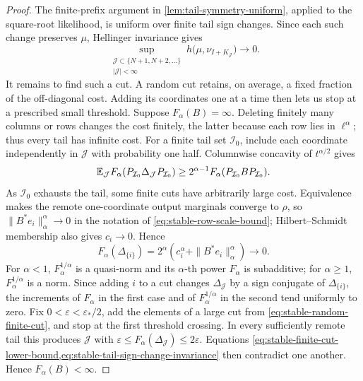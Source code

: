 \begin{proof}
The finite-prefix argument in \cref{lem:tail-symmetry-uniform}, applied to the
square-root likelihood, is uniform over finite tail sign changes.  Since each
such change preserves \(\mu\), Hellinger invariance gives
\begin{equation}
 \sup_{\substack{\mathcal J\subset\{N+1,N+2,\ldots\}\\ |\mathcal J|<\infty}}
 h\bigl(\mu,\nu_{I+K_{\mathcal J}}\bigr)
 \longrightarrow0.
 \label{eq:stable-tail-sign-change-invariance}
\end{equation}
It remains to find such a cut. A random cut retains, on average, a fixed
fraction of the off-diagonal cost. Adding its coordinates one at a time
then lets us stop at a prescribed small threshold. Suppose
\(F_\alpha(B)=\infty\). Deleting finitely many columns or rows
changes the cost finitely, the latter because each row lies in
\(\ell^\alpha\); thus every tail has infinite cost.  For a finite tail set
\(\mathcal I_0\), include each coordinate independently in \(\mathcal J\) with
probability one half.  Columnwise concavity of \(t^{\alpha/2}\) gives
\begin{equation}
 \mathbb E_{\mathcal J}F_\alpha(P_{\mathcal I_0}\Delta_{\mathcal J}P_{\mathcal I_0})
 \ge2^{\alpha-1}F_\alpha(P_{\mathcal I_0}BP_{\mathcal I_0}).
 \label{eq:stable-random-finite-cut}
\end{equation}
As \(\mathcal I_0\) exhausts the tail, some finite cuts have arbitrarily large cost.
Equivalence makes the remote one-coordinate output marginals converge to
\(\rho\), so
\(\|B^*e_i\|_\alpha^\alpha\to0\) in the notation of
\eqref{eq:stable-row-scale-bound}; Hilbert--Schmidt membership also gives
\(c_i\to0\).  Hence
\[
 F_\alpha(\Delta_{\{i\}})
 =2^\alpha(c_i^\alpha+\|B^*e_i\|_\alpha^\alpha)\longrightarrow0.
\]
For \(\alpha<1\), \(F_\alpha^{1/\alpha}\) is a quasi-norm and its
\(\alpha\)-th power \(F_\alpha\) is subadditive; for \(\alpha\ge1\),
\(F_\alpha^{1/\alpha}\) is a norm.  Since adding \(i\) to a cut changes
\(\Delta_{\mathcal J}\) by a sign conjugate of \(\Delta_{\{i\}}\), the
increments of \(F_\alpha\) in the first case and of
\(F_\alpha^{1/\alpha}\) in the second tend uniformly to zero.  Fix
\(0<\varepsilon<\varepsilon_*/2\), add the elements of a large cut from
\eqref{eq:stable-random-finite-cut}, and stop at the first threshold crossing.
In every sufficiently remote tail this produces \(\mathcal J\) with
\(\varepsilon\le F_\alpha(\Delta_{\mathcal J})\le2\varepsilon\).
Equations
\cref{eq:stable-finite-cut-lower-bound,eq:stable-tail-sign-change-invariance}
then contradict one another.
Hence \(F_\alpha(B)<\infty\).


\end{proof}
